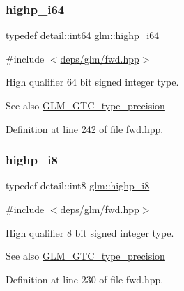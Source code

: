 \subsubsection{\texorpdfstring{highp\+\_\+i64}{highp\_i64}}
{\footnotesize\ttfamily typedef detail\+::int64 \hyperlink{group__gtc__type__precision_gad3cb9a0ac0266ea2c51c6fac256345d1}{glm\+::highp\+\_\+i64}}



{\ttfamily \#include $<$\hyperlink{fwd_8hpp}{deps/glm/fwd.\+hpp}$>$}

High qualifier 64 bit signed integer type. \begin{DoxySeeAlso}{See also}
\hyperlink{group__gtc__type__precision}{G\+L\+M\+\_\+\+G\+T\+C\+\_\+type\+\_\+precision} 
\end{DoxySeeAlso}


Definition at line 242 of file fwd.\+hpp.

\mbox{\label{group__gtc__type__precision_ga8b9eb0b24cce7f14478bfcacb53ce839}} 
\subsubsection{\texorpdfstring{highp\+\_\+i8}{highp\_i8}}
{\footnotesize\ttfamily typedef detail\+::int8 \hyperlink{group__gtc__type__precision_ga8b9eb0b24cce7f14478bfcacb53ce839}{glm\+::highp\+\_\+i8}}



{\ttfamily \#include $<$\hyperlink{fwd_8hpp}{deps/glm/fwd.\+hpp}$>$}

High qualifier 8 bit signed integer type. \begin{DoxySeeAlso}{See also}
\hyperlink{group__gtc__type__precision}{G\+L\+M\+\_\+\+G\+T\+C\+\_\+type\+\_\+precision} 
\end{DoxySeeAlso}


Definition at line 230 of file fwd.\+hpp.

\mbox{\label{group__gtc__type__precision_gaf0430ed80e88c0d1dfbe47f359659c81}} 
